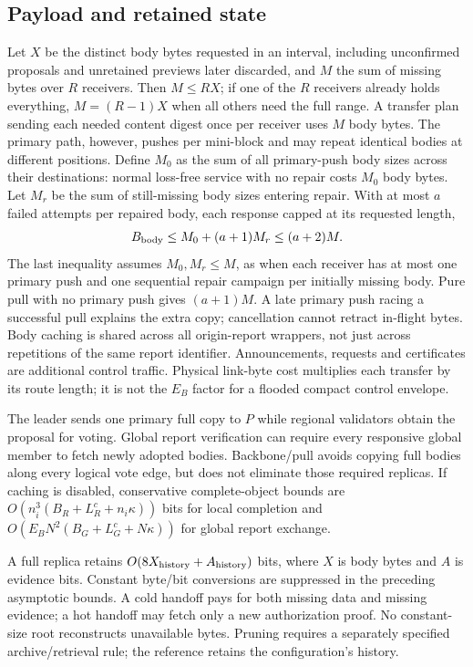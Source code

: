 \documentclass[11pt,a4paper,onecolumn]{article}
\theoremstyle{remark}\newtheorem{example}[definition]{Example}
\begin{document}
\subsection{Payload and retained state}\label{sec:payloadcost}
Let $X$ be the distinct body bytes requested in an interval, including unconfirmed proposals
and unretained previews later discarded, and $M$ the sum of missing bytes over $R$ receivers.
Then $M\leq RX$; if one of the $R$ receivers already holds everything,
$M=(R-1)X$ when all others need the full range. A transfer plan sending each
needed content digest once per receiver uses $M$ body bytes. The primary path,
however, pushes per mini-block and may repeat identical bodies at different
positions. Define $M_0$ as the sum of all primary-push body sizes across their
destinations: normal loss-free service with no repair costs $M_0$ body bytes.
Let $M_r$ be the sum of still-missing
body sizes entering repair. With at most $a$ failed attempts per repaired body,
each response capped at its requested length,
\begin{equation}\label{eq:payload}
 B_{\rm body}\leq M_0+(a+1)M_r\leq(a+2)M.
\end{equation}
The last inequality assumes $M_0,M_r\leq M$, as when each receiver has at most
one primary push and one sequential repair campaign per initially missing body.
Pure pull with no primary push gives $(a+1)M$. A late primary push racing a
successful pull explains the extra copy; cancellation cannot retract in-flight
bytes. Body caching is shared across all origin-report wrappers, not just
across repetitions of the same report identifier.
Announcements, requests and certificates are additional control traffic.
Physical link-byte cost multiplies each transfer by its route length; it is
not the $E_B$ factor for a flooded compact control envelope.

The leader sends one primary full copy to $P$ while regional validators obtain
the proposal for voting. Global report verification can require every responsive
global member to fetch newly adopted bodies. Backbone/pull avoids copying full
bodies along every logical vote edge, but does not eliminate those required
replicas. If caching is disabled, conservative complete-object bounds are
$O(n_i^3(B_R+L_R^c+n_i\kappa))$ bits for local completion and
$O(E_BN^2(B_G+L_G^c+N\kappa))$ for global report exchange.

A full replica retains $O(8X_{\rm history}+A_{\rm history})$ bits, where $X$ is
body bytes and $A$ is evidence bits. Constant byte/bit conversions are suppressed
in the preceding asymptotic bounds. A cold handoff pays for
both missing data and missing evidence; a hot handoff may fetch only a new
authorization proof. No constant-size root reconstructs unavailable bytes.
Pruning requires a separately specified archive/retrieval rule; the reference
retains the configuration's history.
\end{document}
